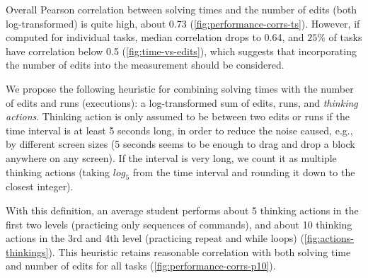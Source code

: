 Overall Pearson correlation between solving times and the number of edits (both
log-transformed) is quite high, about 0.73 (\cref{fig:performance-corrs-ts}).
However, if computed for individual tasks,
median correlation drops to 0.64, %
and $25\%$ of tasks have correlation below 0.5 %
(\cref{fig:time-vs-edits}), which suggests that incorporating the number of edits into the
measurement should be considered.

We propose the following heuristic for combining solving times with the number
of edits and runs (executions): a log-transformed sum of edits, runs, and \emph{thinking
actions}.
Thinking action is only assumed to be between two edits or runs if the time interval
is at least 5 seconds long, in order to reduce the noise caused, e.g., by
different screen sizes
(5 seconds seems to be enough to drag and drop a block anywhere on any screen).
If the interval is very long,
we count it as multiple thinking actions (taking $log_5$ from the time interval
and rounding it down to the closest integer).

With this definition, an average student performs about 5 thinking actions
in the first two levels (practicing only sequences of commands),
and about 10 thinking actions in the 3rd and 4th level (practicing repeat and while loops)
(\cref{fig:actions-thinkings}).
This heuristic retains reasonable correlation with both solving time
and number of edits for all tasks (\cref{fig:performance-corrs-p10}).



